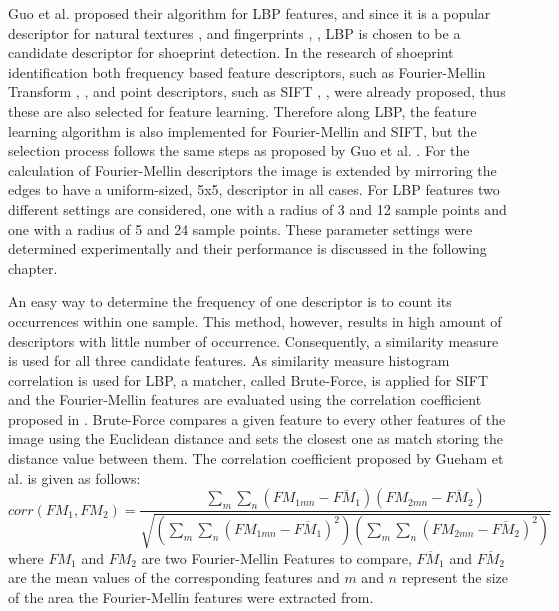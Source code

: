 \documentclass[draft,final]{vutinfth} %
\begin{document}
\par
Guo et al. \cite{guo2012discriminative} proposed their algorithm for LBP features, and since it is a popular descriptor for natural textures \cite{hong2014combining}, \cite{ahonen2009rotation} and fingerprints \cite{wang2013pixel}, \cite{rida2018palmprint}, LBP is chosen to be a candidate descriptor for shoeprint detection.
In the research of shoeprint identification both frequency based feature descriptors, such as Fourier-Mellin Transform \cite{wu2019crime}, \cite{gueham2008automatic}, and point descriptors, such as SIFT \cite{nibouche2009rotation}, \cite{richetelli2017classification}, were already proposed, thus these are also selected for feature learning.
Therefore along LBP, the feature learning algorithm is also implemented for Fourier-Mellin and SIFT, but the selection process follows the same steps as proposed by Guo et al. \cite{guo2012discriminative}.
For the calculation of Fourier-Mellin descriptors the image is extended by mirroring the edges to have a uniform-sized, 5x5, descriptor in all cases.
For LBP features two different settings are considered, one with a radius of 3 and 12 sample points and one with a radius of 5 and 24 sample points.
These parameter settings were determined experimentally and their performance is discussed in the following chapter.
\par
An easy way to determine the frequency of one descriptor is to count its occurrences within one sample.
This method, however, results in high amount of descriptors with little number of occurrence.
Consequently, a similarity measure is used for all three candidate features. 
As similarity measure histogram correlation is used for LBP, a matcher, called Brute-Force, is applied for SIFT and the Fourier-Mellin features are evaluated using the correlation coefficient proposed  in \cite{gueham2008automatic}.
Brute-Force compares a given feature to every other features of the image using the Euclidean distance and sets the closest one as match storing the distance value between them.
The correlation coefficient proposed by Gueham et al. \cite{gueham2008automatic} is given as follows:
\[ corr(FM_{1},FM_{2}) = \frac{\sum\limits_{m}\sum\limits_{n}(FM_{1mn}-\overline{FM_{1}})(FM_{2mn}-\overline{FM_{2}})}{\sqrt{(\sum\limits_{m}\sum\limits_{n}(FM_{1mn}-\overline{FM_{1}})^2)(\sum\limits_{m}\sum\limits_{n}(FM_{2mn}-\overline{FM_{2}})^2)}}  \]
\label{FMcorr}
where $FM_{1}$ and $FM_{2}$ are two Fourier-Mellin Features to compare, $\overline{FM_{1}}$ and $\overline{FM_{2}}$ are the mean values of the corresponding features and $m$ and $n$ represent the size of the area the Fourier-Mellin features were extracted from.
\end{document}
